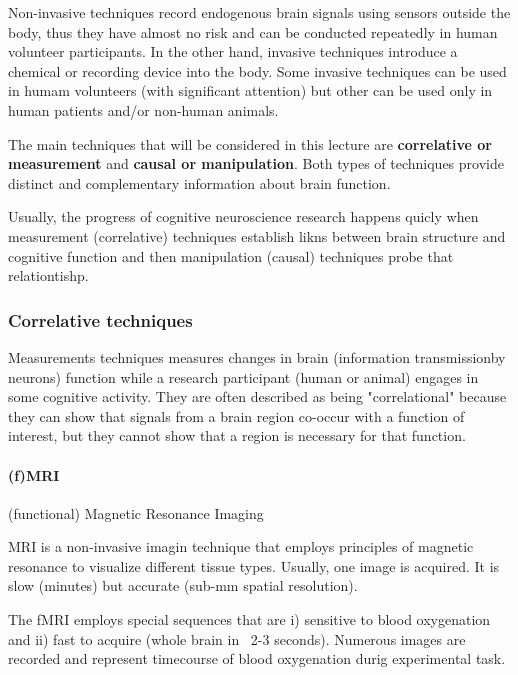 \documentclass[12pt,article,oneside,a4paper]{memoir}
\begin{document}
Non-invasive techniques record endogenous brain signals using sensors outside the body, thus they have almost no risk and can be conducted repeatedly in human volunteer participants. In the other hand, invasive techniques introduce a chemical or recording device into the body. Some invasive techniques can be used in humam volunteers (with significant attention) but other can be used only in human patients and/or non-human animals.

The main techniques that will be considered in this lecture are \textbf{correlative or measurement} and \textbf{causal or manipulation}. Both types of techniques provide distinct and complementary information about brain function.

Usually, the progress of cognitive neuroscience research happens quicly when measurement (correlative) techniques establish likns between brain structure and cognitive function and then manipulation (causal) techniques probe that relationtishp.

\subsubsection{Correlative techniques}

Measurements techniques measures changes in brain (information transmissionby neurons) function while a research participant (human or animal) engages in some cognitive activity. They are often described as being "correlational" because they can show that signals from a brain region co-occur with a function of interest, but they cannot show that a region is necessary for that function.

\paragraph{(f)MRI} (functional) Magnetic Resonance Imaging

MRI is a non-invasive imagin technique that employs principles of magnetic resonance to visualize different tissue types. Usually, one image is acquired. It is slow (minutes) but accurate (sub-mm spatial resolution).

The fMRI employs special sequences that are i) sensitive to blood oxygenation and ii) fast to acquire (whole brain in ~2-3 seconds). Numerous images are recorded and represent timecourse of blood oxygenation durig experimental task.
\end{document}

